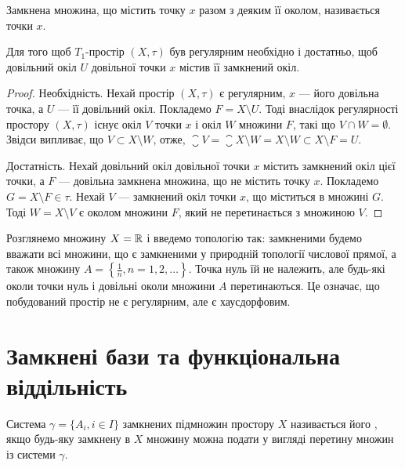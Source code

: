 \begin{definition}
Замкнена множина, що містить точку $x$
разом з деяким її околом, називається 
точки $x$.
\end{definition}

\begin{theorem}
Для того щоб $T_1$-простір $(X, \tau)$ був регулярним необхідно і достатньо,
щоб довільний окіл $U$ довільної точки $x$ містив її
замкнений окіл.
\end{theorem}

\begin{proof}
Необхідність. Нехай простір $(X, \tau)$ є
регулярним, $x$ --- його довільна точка, а $U$ --- її довільний
окіл. Покладемо $F = X \setminus U$. Тоді внаслідок регулярності
простору $(X, \tau)$ існує окіл $V$ точки $x$ і окіл $W$ множини
$F$, такі що $V \cap W = \emptyset$. Звідси випливає, що $V \subset X \setminus W$,
отже, $\closure{V} = \closure{X \setminus W} = X \setminus W \subset X \setminus F = U$.

Достатність. Нехай довільний окіл довільної точки $x$
містить замкнений окіл цієї точки, а $F$ --- довільна замкнена
множина, що не містить точку $x$. Покладемо $G = X \setminus F \in \tau$.
Нехай $V$ --- замкнений окіл точки $x$, що міститься в
множині $G$. Тоді $W = X \setminus V$ є околом множини $F$, який не
перетинається з множиною $V$.
\end{proof}

\begin{example}
Розглянемо множину $X = \mathbb{R}$ і введемо
топологію так: замкненими будемо вважати всі множини,
що є замкненими у природній топології числової прямої, а
також множину $A = \left\{ \frac1n, n = 1, 2, \ldots \right\}$.
Точка нуль їй не належить, але будь-які околи точки нуль і довільні околи
множини $A$ перетинаються. Це означає, що побудований
простір не є регулярним, але є хаусдорфовим.
\end{example}

\section{Замкнені бази та функціональна віддільність}

\begin{definition}
Система $\gamma = \{ A_i, i \in I\}$ замкнених підмножин
простору $X$ називається його , якщо будь-яку замкнену
в $X$ множину можна подати у вигляді перетину множин із системи $\gamma$.
\end{definition}

